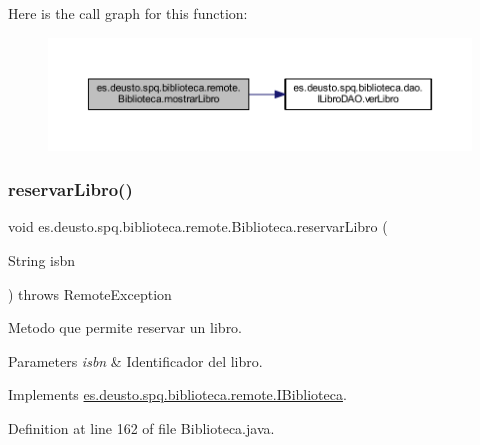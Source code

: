Here is the call graph for this function\+:
\nopagebreak
\begin{figure}[H]
\begin{center}
\leavevmode
\includegraphics[width=350pt]{classes_1_1deusto_1_1spq_1_1biblioteca_1_1remote_1_1_biblioteca_a6455f223a57806146e77149429caf6db_cgraph}
\end{center}
\end{figure}
\mbox{\label{classes_1_1deusto_1_1spq_1_1biblioteca_1_1remote_1_1_biblioteca_aabb7d3ecb5206da47fc6c4fa315e4c6e}} 
\subsubsection{\texorpdfstring{reservar\+Libro()}{reservarLibro()}}
{\footnotesize\ttfamily void es.\+deusto.\+spq.\+biblioteca.\+remote.\+Biblioteca.\+reservar\+Libro (\begin{DoxyParamCaption}\item[{String}]{isbn }\end{DoxyParamCaption}) throws Remote\+Exception}

Metodo que permite reservar un libro. 
\begin{DoxyParams}{Parameters}
{\em isbn} & Identificador del libro. \\
\hline
\end{DoxyParams}


Implements \mbox{\hyperlink{interfacees_1_1deusto_1_1spq_1_1biblioteca_1_1remote_1_1_i_biblioteca_af8c7a0e5361bfac62c0b8804d9112b51}{es.\+deusto.\+spq.\+biblioteca.\+remote.\+I\+Biblioteca}}.



Definition at line 162 of file Biblioteca.\+java.

